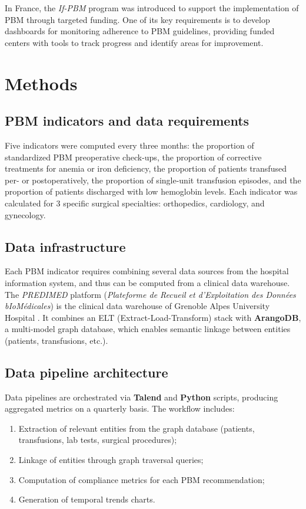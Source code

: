 \documentclass{IOS-Book-Article}
\begin{document}
In France, the \textit{If-PBM} program was introduced to support the implementation of PBM 
through targeted funding.  One of its key requirements is to develop dashboards for monitoring 
adherence to PBM guidelines, providing funded centers with tools to track progress and identify areas
for improvement.

\section{Methods}

\subsection{PBM indicators and data requirements}

Five indicators were computed every three months: the proportion of standardized PBM preoperative check-ups,
 the proportion of corrective treatments for anemia or iron deficiency, the proportion of patients 
 transfused per- or postoperatively, the proportion of single-unit transfusion episodes, and the 
 proportion of patients discharged with low hemoglobin levels. Each indicator was calculated for 3 
 specific surgical specialties: orthopedics, cardiology, and gynecology. 

\subsection{Data infrastructure}

Each PBM indicator requires combining several data sources from the hospital information system, and thus
can be computed from a clinical data warehouse.
The \textit{PREDIMED} platform (\textit{Plateforme de Recueil et d'Exploitation des Données bIoMédicales})
 is the clinical data warehouse of Grenoble Alpes University Hospital \cite{Artemova2019}. 
 It combines an ELT (Extract-Load-Transform) stack with \textbf{ArangoDB}, a multi-model graph database, 
 which enables semantic linkage between entities (patients, transfusions, etc.).

\subsection{Data pipeline architecture}

Data pipelines are orchestrated via \textbf{Talend} and \textbf{Python} scripts, producing aggregated 
metrics on a quarterly basis. The workflow includes:

\begin{enumerate}
\item Extraction of relevant entities from the graph database (patients, transfusions, lab tests, surgical procedures);
\item Linkage of entities through graph traversal queries;
\item Computation of compliance metrics for each PBM recommendation;
\item Generation of temporal trends charts.
\end{enumerate}
\end{document}
